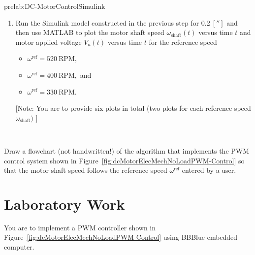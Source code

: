 \begin{prelab}{prelab:DC-MotorControlSimulink}
\begin{enumerate}
\item Run the Simulink model constructed in the previous step for $0.2~[\second]$ and then use MATLAB to plot the motor shaft speed $\omega_{\mathrm{shaft}}(t)$ versus time $t$ and motor applied voltage  $V_a(t)$ versus time $t$ for the reference speed    %
  \begin{itemize}
  \item $\omega^{\mathrm{ref}} = 520~\mathrm{RPM},$
  \item $\omega^{\mathrm{ref}} = 400~\mathrm{RPM},$ and 
  \item $\omega^{\mathrm{ref}} = 330~\mathrm{RPM}.$    
  \end{itemize}

  [Note: You are to provide six plots in total (two plots  for each reference speed $\omega_{\mathrm{shaft}})$ ]
\end{enumerate}

\end{prelab}
%




\begin{prelab}
  ~

Draw a flowchart (not handwritten!)  of the algorithm that implements the PWM control system shown in Figure~\ref{fig:dcMotorElecMechNoLoadPWM-Control} so that the motor shaft speed follows the reference speed $\omega^{\mathrm{ref}}$ entered by a user. 
\end{prelab}

\section{Laboratory Work}

You are to implement a PWM controller shown in Figure~\ref{fig:dcMotorElecMechNoLoadPWM-Control} using BBBlue embedded computer.  




